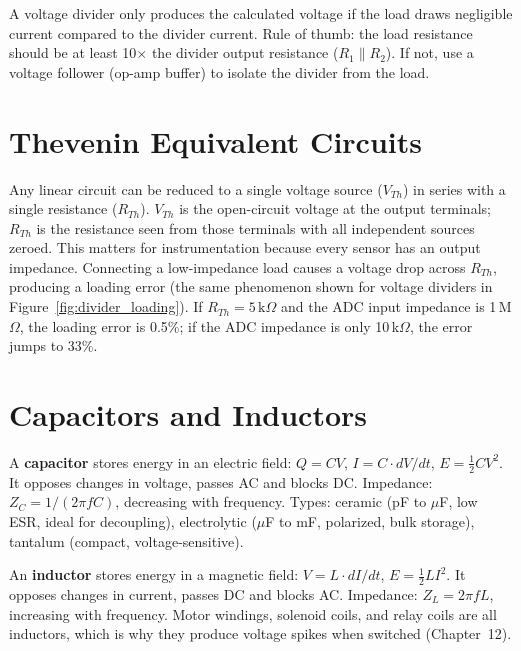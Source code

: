 \begin{warningbox}
A voltage divider only produces the calculated voltage if the load draws negligible current compared to the divider current. Rule of thumb: the load resistance should be at least 10$\times$ the divider output resistance ($R_1 \| R_2$). If not, use a voltage follower (op-amp buffer) to isolate the divider from the load.
\end{warningbox}


\section{Thevenin Equivalent Circuits}

Any linear circuit can be reduced to a single voltage source ($V_{Th}$) in series with a single resistance ($R_{Th}$). $V_{Th}$ is the open-circuit voltage at the output terminals; $R_{Th}$ is the resistance seen from those terminals with all independent sources zeroed. This matters for instrumentation because every sensor has an output impedance. Connecting a low-impedance load causes a voltage drop across $R_{Th}$, producing a loading error (the same phenomenon shown for voltage dividers in Figure~\ref{fig:divider_loading}). If $R_{Th} = 5\,\text{k}\Omega$ and the ADC input impedance is 1\,M$\Omega$, the loading error is 0.5\%; if the ADC impedance is only 10\,k$\Omega$, the error jumps to 33\%.


\section{Capacitors and Inductors}

A \textbf{capacitor} stores energy in an electric field: $Q = CV$, $I = C \cdot dV/dt$, $E = \frac{1}{2}CV^2$. It opposes changes in voltage, passes AC and blocks DC. Impedance: $Z_C = 1/(2\pi f C)$, decreasing with frequency. Types: ceramic (pF to $\mu$F, low ESR, ideal for decoupling), electrolytic ($\mu$F to mF, polarized, bulk storage), tantalum (compact, voltage-sensitive).

An \textbf{inductor} stores energy in a magnetic field: $V = L \cdot dI/dt$, $E = \frac{1}{2}LI^2$. It opposes changes in current, passes DC and blocks AC. Impedance: $Z_L = 2\pi f L$, increasing with frequency. Motor windings, solenoid coils, and relay coils are all inductors, which is why they produce voltage spikes when switched (Chapter~12).


